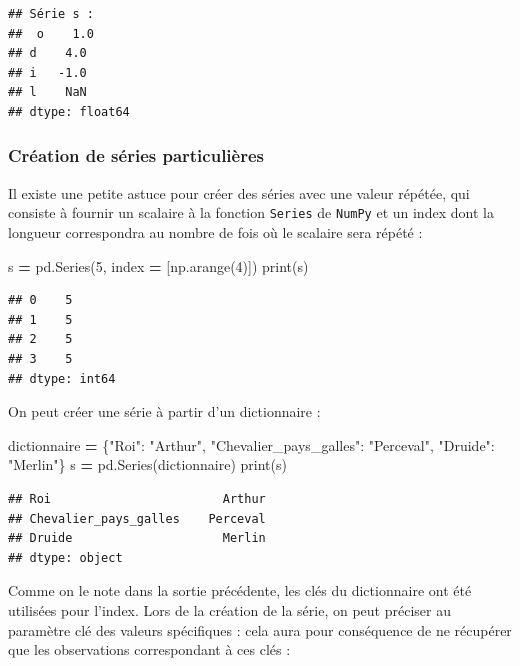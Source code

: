 \documentclass[
  12pt,
]{book}
\newenvironment{Shaded}{\begin{snugshade}}{\end{snugshade}}
\newcommand{\BuiltInTok}[1]{#1}
\newcommand{\DecValTok}[1]{\textcolor[rgb]{0.00,0.00,0.81}{#1}}
\newcommand{\NormalTok}[1]{#1}
\newcommand{\OperatorTok}[1]{\textcolor[rgb]{0.81,0.36,0.00}{\textbf{#1}}}
\newcommand{\StringTok}[1]{\textcolor[rgb]{0.31,0.60,0.02}{#1}}
\numberwithin{equation}{section}
\numberwithin{countremarque}{section}
\begin{document}
\begin{lstlisting}
## Série s : 
##  o    1.0
## d    4.0
## i   -1.0
## l    NaN
## dtype: float64
\end{lstlisting}

\subsubsection{Création de séries particulières}\label{cruxe9ation-de-suxe9ries-particuliuxe8res}

Il existe une petite astuce pour créer des séries avec une valeur répétée, qui consiste à fournir un scalaire à la fonction \texttt{Series} de \texttt{NumPy} et un index dont la longueur correspondra au nombre de fois où le scalaire sera répété :

\begin{Shaded}
\begin{Highlighting}[]
\NormalTok{s }\OperatorTok{=}\NormalTok{ pd.Series(}\DecValTok{5}\NormalTok{, index }\OperatorTok{=}\NormalTok{ [np.arange(}\DecValTok{4}\NormalTok{)])}
\BuiltInTok{print}\NormalTok{(s)}
\end{Highlighting}
\end{Shaded}

\begin{lstlisting}
## 0    5
## 1    5
## 2    5
## 3    5
## dtype: int64
\end{lstlisting}

On peut créer une série à partir d'un dictionnaire :

\begin{Shaded}
\begin{Highlighting}[]
\NormalTok{dictionnaire }\OperatorTok{=}\NormalTok{ \{}\StringTok{"Roi"}\NormalTok{: }\StringTok{"Arthur"}\NormalTok{,}
                \StringTok{"Chevalier\_pays\_galles"}\NormalTok{: }\StringTok{"Perceval"}\NormalTok{,}
                \StringTok{"Druide"}\NormalTok{: }\StringTok{"Merlin"}\NormalTok{\}}
\NormalTok{s }\OperatorTok{=}\NormalTok{ pd.Series(dictionnaire)}
\BuiltInTok{print}\NormalTok{(s)}
\end{Highlighting}
\end{Shaded}

\begin{lstlisting}
## Roi                        Arthur
## Chevalier_pays_galles    Perceval
## Druide                     Merlin
## dtype: object
\end{lstlisting}

Comme on le note dans la sortie précédente, les clés du dictionnaire ont été utilisées pour l'index. Lors de la création de la série, on peut préciser au paramètre clé des valeurs spécifiques : cela aura pour conséquence de ne récupérer que les observations correspondant à ces clés :
\end{document}

